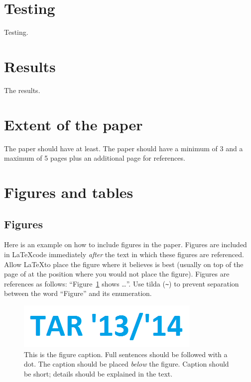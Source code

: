 \documentclass[10pt, a4paper]{article}
\begin{document}

\section{Testing}
Testing.

\section{Results}
The results.

\section{Extent of the paper}

The paper should have at least. The paper should have a minimum of 3 and a maximum of 5 pages plus an additional page for references.

\section{Figures and tables}

\subsection{Figures}

Here is an example on how to include figures in the paper. Figures are included in \LaTeX code immediately \textit{after} the text in which these figures are referenced. Allow \LaTeX to place the figure where it believes is best (usually on top of the page of at the position where you would not place the figure). Figures are references as follows: ``Figure~\ref{fig:figure1} shows \dots''. Use tilda (\verb.~.) to prevent separation between the word ``Figure'' and its enumeration. 

\begin{figure}
\begin{center}
\includegraphics[width=\columnwidth]{tar1314}
\caption{This is the figure caption. Full sentences should be followed with a dot. The caption should be placed \textit{below} the figure. Caption should be short; details should be explained in the text.}
\label{fig:figure1}
\end{center}
\end{figure}
\end{document}
